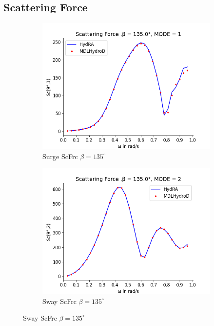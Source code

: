 \subsection{Scattering Force}
\begin{figure}[H]
    \centering
    \begin{subfigure}[b]{0.49\textwidth}
        \includegraphics[width=\textwidth]{plots/kcs/sc/sc1.png}
        \caption{Surge ScFrc $\beta = 135^{\circ}$}
    \end{subfigure}
    \begin{subfigure}[b]{0.49\textwidth}
        \includegraphics[width=\textwidth]{plots/kcs/sc/sc2.png}
        \caption{Sway ScFrc $\beta = 135^{\circ}$}
    \end{subfigure}

\end{figure}
